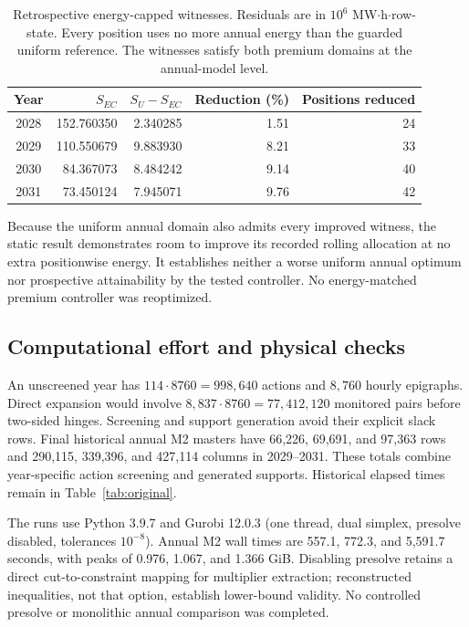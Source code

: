 \documentclass[10pt,journal]{IEEEtran}
\begin{document}
\begin{table}[t]
\centering
\caption{Retrospective energy-capped witnesses. Residuals are in $10^6$ MW$\cdot$h$\cdot$row-state. Every position uses no more annual energy than the guarded uniform reference. The witnesses satisfy both premium domains at the annual-model level.}
\label{tab:static}
\footnotesize
\begin{tabular}{@{}crrrr@{}}
\toprule
Year & $S_{EC}$ & $S_U-S_{EC}$ & Reduction (\%) & Positions reduced\\
\midrule
2028 & 152.760350 & 2.340285 & 1.51 & 24\\
2029 & 110.550679 & 9.883930 & 8.21 & 33\\
2030 & 84.367073 & 8.484242 & 9.14 & 40\\
2031 & 73.450124 & 7.945071 & 9.76 & 42\\
\bottomrule
\end{tabular}
\end{table}

Because the uniform annual domain also admits every improved witness, the static result demonstrates room to improve its recorded rolling allocation at no extra positionwise energy. It establishes neither a worse uniform annual optimum nor prospective attainability by the tested controller. No energy-matched premium controller was reoptimized.

\subsection{Computational effort and physical checks}
An unscreened year has $114\cdot8760=998{,}640$ actions and $8{,}760$ hourly epigraphs. Direct expansion would involve $8{,}837\cdot8760=77{,}412{,}120$ monitored pairs before two-sided hinges. Screening and support generation avoid their explicit slack rows. Final historical annual M2 masters have 66,226, 69,691, and 97,363 rows and 290,115, 339,396, and 427,114 columns in 2029--2031. These totals combine year-specific action screening and generated supports. Historical elapsed times remain in Table~\ref{tab:original}.

The runs use Python 3.9.7 and Gurobi 12.0.3 (one thread, dual simplex, presolve disabled, tolerances $10^{-8}$). Annual M2 wall times are 557.1, 772.3, and 5,591.7 seconds, with peaks of 0.976, 1.067, and 1.366 GiB. Disabling presolve retains a direct cut-to-constraint mapping for multiplier extraction; reconstructed inequalities, not that option, establish lower-bound validity. No controlled presolve or monolithic annual comparison was completed.
\end{document}
